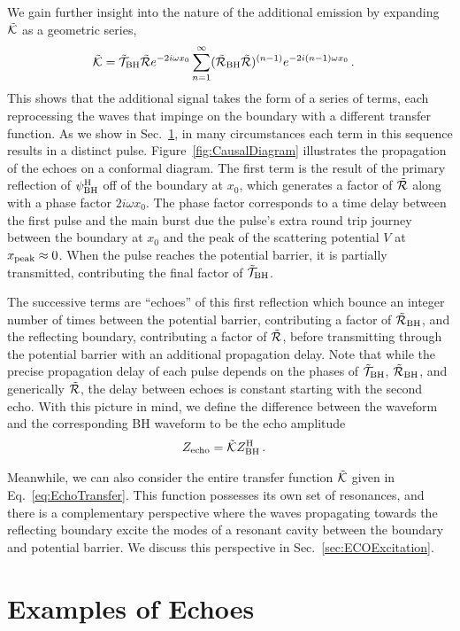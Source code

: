 \begin{refsection}
We gain further insight into the nature of the additional emission by expanding $\tilde{\mathcal K}$ as a geometric series,
\begin{align}
\tilde{\mathcal K} & = \tilde{\mathcal T}_{\rm BH} \tilde{\mathcal R} e^{-2i \omega x_0} \sum_{n=1}^{\infty} (\tilde{\mathcal R}_{\rm BH} \tilde{\mathcal R})^{(n-1)} e^{-2i(n-1)\omega x_0 } \,. \label{eq:Kgeo}
\end{align}
This shows that the additional signal takes the form of a series of terms, each reprocessing the waves that impinge on the boundary with a different transfer function. 
As we show in Sec.~\ref{sec:Echoes}, in many circumstances each term in this sequence results in a distinct pulse. 
Figure~\ref{fig:CausalDiagram} illustrates the propagation of the echoes on a conformal diagram.
The first term is the result of the primary reflection of $\psi^{\rm H}_{\rm BH}$ off of the boundary at $x_0$, which generates a factor of $\tilde{\mathcal R} $ along with a phase factor $ 2 i \omega x_0$. 
The phase factor corresponds to a time delay between the first pulse and the main burst due the pulse's extra round trip journey between the boundary at $x_0$ and the peak of the scattering potential $V$ at $x_{\rm peak}\approx 0$. 
When the pulse reaches the potential barrier, it is partially transmitted, contributing the final factor of $\tilde{\mathcal T}_{\rm BH}$.

The successive terms are ``echoes'' of this first reflection which bounce an integer number of times between the potential barrier, contributing a factor of $\tilde{\mathcal R}_{\rm BH}$, and the reflecting boundary, contributing a factor of $\tilde{\mathcal R}$, before transmitting through the potential barrier with an additional propagation delay.
Note that while the precise propagation delay of each pulse depends on the phases of $\tilde{\mathcal T}_{\rm BH}$, $\tilde{\mathcal R}_{\rm BH}$, and generically $\tilde{\mathcal R}$, the delay between echoes is constant starting with the second echo.
With this picture in mind, we define the difference between the waveform and the corresponding BH waveform to be the echo amplitude
\begin{align}
Z_{\rm echo} & = \tilde{\mathcal K} Z^{\rm H}_{\rm BH} \,.
\end{align}

Meanwhile, we can also consider the entire transfer function $\tilde{\mathcal K}$ given in Eq.~\eqref{eq:EchoTransfer}.
This function possesses its own set of resonances, and there is a complementary perspective where the waves propagating towards the reflecting boundary excite the modes of a resonant cavity between the boundary and potential barrier.
We discuss this perspective in Sec.~\ref{sec:ECOExcitation}.


\section{Examples of Echoes}
\label{sec:Echoes}


\end{refsection}
